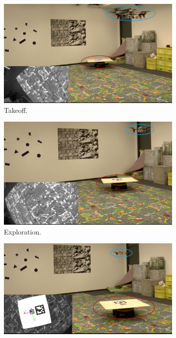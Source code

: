 \begin{figure}[!htbp]
  \centering
   \begin{subfigure}[b]{0.5\textwidth}
        \includegraphics[width=\textwidth]{img/takeoff2.jpg}
        \caption{Takeoff.}
   \end{subfigure}
   \begin{subfigure}[b]{0.5\textwidth}
        \includegraphics[width=\textwidth]{img/exploring2.jpg}
        \caption{Exploration.}
        \label{fig:two}
   \end{subfigure}
   \begin{subfigure}[b]{0.5\textwidth}
        \includegraphics[width=\textwidth]{img/align2.jpg}

\end{subfigure}
\end{figure}
